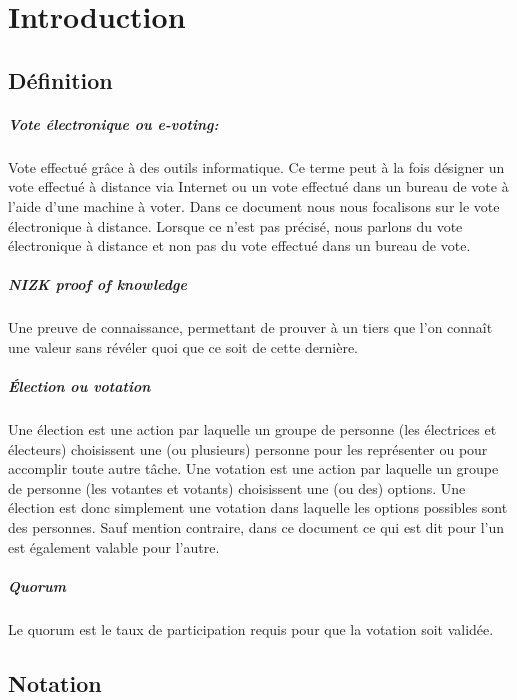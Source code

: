 \documentclass[../report]{subfiles}
\begin{document}
  \chapter{Introduction}

  \section{Définition}

  \paragraph{Vote électronique ou e-voting:}
  Vote effectué grâce à des outils informatique.
  Ce terme peut à la fois désigner un vote effectué à distance via Internet ou un vote effectué
  dans un bureau de vote à l'aide d'une machine à voter.
  Dans ce document nous nous focalisons sur le vote électronique à distance.
  Lorsque ce n'est pas précisé, nous parlons du vote électronique à distance et non pas du vote effectué dans un bureau de vote.

  \paragraph{NIZK proof of knowledge}
  Une preuve de connaissance, permettant de prouver à un tiers que l'on connaît une valeur sans révéler quoi que ce soit de cette dernière.

  \paragraph{Élection ou votation}
  Une élection est une action par laquelle un groupe de personne (les électrices et électeurs) choisissent une (ou plusieurs) personne
  pour les représenter ou pour accomplir toute autre tâche.
  Une votation est une action par laquelle un groupe de personne (les votantes et votants) choisissent une (ou des) options.
  Une élection est donc simplement une votation dans laquelle les options possibles sont des personnes.
  Sauf mention contraire, dans ce document ce qui est dit pour l'un est également valable pour l'autre.

  \paragraph{Quorum}
  Le quorum est le taux de participation requis pour que la votation soit validée.

  \section{Notation}
  
\end{document}
